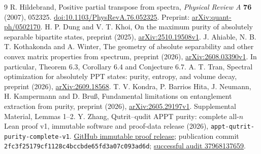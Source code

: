 \documentclass[11pt]{article}
\theoremstyle{remark}\newtheorem{remark}[theorem]{Remark}
\newcommand{\proofcommit}{\texttt{2fc3f25179cf1128c4bccbde65fd3a07c093ad6d}}
\begin{document}
\begin{thebibliography}{9}\small
{} R. Hildebrand, Positive partial transpose from spectra, \emph{Physical Review A} \textbf{76} (2007), 052325. \href{https://doi.org/10.1103/PhysRevA.76.052325}{doi:10.1103/PhysRevA.76.052325}. Preprint: \href{https://arxiv.org/abs/quant-ph/0502170}{arXiv:quant-ph/0502170}.
 H. P. Dung and V. T. Khoi, On the maximum purity of absolutely separable bipartite states, preprint (2025), \href{https://arxiv.org/abs/2510.19508v1}{arXiv:2510.19508v1}.
 J. Ahiable, N. B. T. Kothakonda and A. Winter, The geometry of absolute separability and other convex matrix properties from spectrum, preprint (2026), \href{https://arxiv.org/abs/2608.03390v1}{arXiv:2608.03390v1}. In particular, Theorem 6.3, Corollary 6.4 and Conjecture 6.7.
 A. T. Tran, Spectral optimization for absolutely PPT states: purity, entropy, and volume decay, preprint (2026), \href{https://arxiv.org/abs/2609.18568}{arXiv:2609.18568}.
 T. V. Kondra, P. Barrios Hita, J. Neumann, H. Kampermann and D. Bru{\ss}, Fundamental limitations on entanglement extraction from purity, preprint (2026), \href{https://arxiv.org/abs/2605.29197v1}{arXiv:2605.29197v1}. Supplemental Material, Lemmas 1--2.
 Y. Zhang, Qutrit--qudit APPT purity: complete all-$n$ Lean proof v1, immutable software and proof-data release (2026), \texttt{appt-qutrit-purity-complete-v1}. \href{https://github.com/mxym/math/releases/tag/appt-qutrit-purity-complete-v1}{GitHub immutable proof release}; publication commit \proofcommit; \href{https://github.com/mxym/math/actions/runs/37968137659}{successful audit 37968137659}.
\end{thebibliography}
\end{document}
